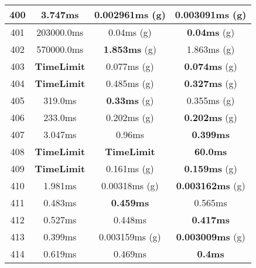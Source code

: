 \begin{table}[H]
\begin{minipage}{5cm}
{\begin{tabular}{|c|c|c|c|}
\hline
400 & 3.747ms & \textbf{0.002961ms} (g) & 0.003091ms (g) \\
\hline
401 & 203000.0ms & 0.04ms (g) & \textbf{0.04ms} (g) \\
\hline
402 & 570000.0ms & \textbf{1.853ms} (g) & 1.863ms (g) \\
\hline
403 & \textbf{TimeLimit} & 0.077ms (g) & \textbf{0.074ms} (g) \\
\hline
404 & \textbf{TimeLimit} & 0.485ms (g) & \textbf{0.327ms} (g) \\
\hline
405 & 319.0ms & \textbf{0.33ms} (g) & 0.355ms (g) \\
\hline
406 & 233.0ms & 0.202ms (g) & \textbf{0.202ms} (g) \\
\hline
407 & 3.047ms & 0.96ms & \textbf{0.399ms} \\
\hline
408 & \textbf{TimeLimit} & \textbf{TimeLimit} & \textbf{60.0ms} \\
\hline
409 & \textbf{TimeLimit} & 0.161ms (g) & \textbf{0.159ms} (g) \\
\hline
410 & 1.981ms & 0.00318ms (g) & \textbf{0.003162ms} (g) \\
\hline
411 & 0.483ms & \textbf{0.459ms} & 0.565ms \\
\hline
412 & 0.527ms & 0.448ms & \textbf{0.417ms} \\
\hline
413 & 0.399ms & 0.003159ms (g) & \textbf{0.003009ms} (g) \\
\hline
414 & 0.619ms & 0.469ms & \textbf{0.4ms} \\
\hline
\end{tabular}
}
\end{minipage}
\begin{minipage}{5cm} 
\end{minipage}
\end{table}
